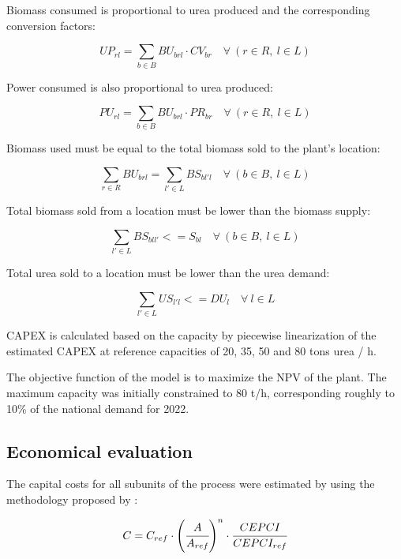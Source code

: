 \documentclass[a4paper, titlepage]{article}
\begin{document}
Biomass consumed is proportional to urea produced and the corresponding conversion factors:

\begin{equation}
	UP_{rl} = \sum_{b \in B} BU_{brl} \cdot CV_{br} \quad \forall \ (r \in R, \ l \in L)
\end{equation}

Power consumed is also proportional to urea produced:

\begin{equation}
	PU_{rl} = \sum_{b \in B} BU_{brl} \cdot PR_{br} \quad \forall \ (r \in R, \ l \in L)
\end{equation}

Biomass used must be equal to the total biomass sold to the plant's location:

\begin{equation}
	\sum_{r \in R} BU_{brl} = \sum_{l' \in L} BS_{bl'l} \quad \forall \ (b \in B, \ l \in L) 
\end{equation}

Total biomass sold from a location must be lower than the biomass supply:

\begin{equation}
	\sum_{l' \in L} BS_{bll'} <= S_{bl} \quad \forall \ (b \in B, \ l \in L)
\end{equation}

Total urea sold to a location must be lower than the urea demand:

\begin{equation}
	\sum_{l' \in L} US_{l'l} <= DU_l \quad \forall \ l \in L 
\end{equation}

CAPEX is calculated based on the capacity by piecewise linearization of the estimated CAPEX at reference capacities of
20, 35, 50 and 80 tons urea / h.

The objective function of the model is to maximize the NPV of the plant. The maximum capacity was initially constrained
to 80 t/h, corresponding roughly to 10\% of the national demand for 2022.


\subsection{Economical evaluation}
The capital costs for all subunits of the process were estimated by using the methodology proposed by
\textcite{turtonAnalysisSynthesisDesign2018}:

\begin{equation}
	C = C_{ref} \cdot \left( \cfrac{A}{A_{ref}} \right)^n \cdot \cfrac{CEPCI}{CEPCI_{ref}}
\end{equation}
\end{document}
